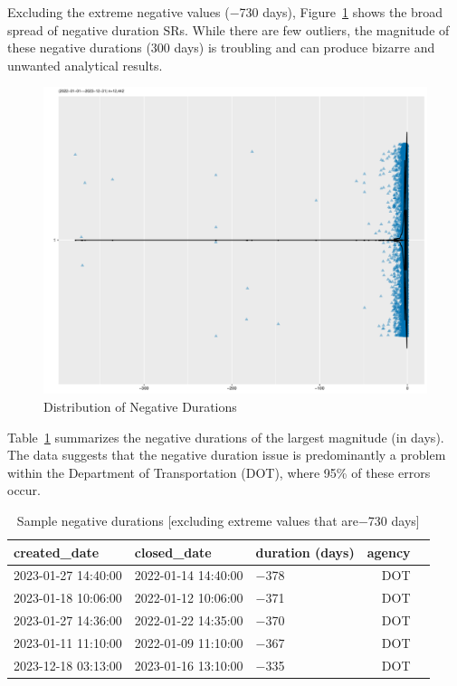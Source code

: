 \documentclass[linenumber]{jdsart}
\begin{document}
Excluding the extreme negative values ($-$730 days), 
Figure~\ref{fig:negative-duration-violin} shows the broad spread of 
negative duration SRs. While there are few outliers, the magnitude 
of these negative durations (300 days) is troubling and can produce 
bizarre and unwanted analytical results.

\begin{figure}[tbp]
	 \centering
 	 \includegraphics[width=\textwidth]{negative_duration_SR_violin.pdf}
 \caption{Distribution of Negative Durations}
 \label{fig:negative-duration-violin}
\end{figure}

Table~\ref{tab:largest-errors} summarizes the 
negative durations of the largest magnitude (in days). The data 
suggests that the negative duration issue is predominantly a problem 
within the Department of Transportation (DOT), where 95\% of these 
errors occur.

\begin{table}[tbp]
  \centering
  \caption{Sample  negative durations [excluding extreme  values that are$-$730 days]}
   \label{tab:largest-errors}
 	\begin{tabular}{l l l r l}
    \toprule
    {created\_date} & {closed\_date} & {duration (days)}  & {agency} \\
    \midrule
    2023-01-27 14:40:00 & 2022-01-14 14:40:00 & $-$378 & DOT \\
    2023-01-18 10:06:00 & 2022-01-12 10:06:00 & $-$371 & DOT \\
    2023-01-27 14:36:00 & 2022-01-22 14:35:00 & $-$370 & DOT \\
    2023-01-11 11:10:00 & 2022-01-09 11:10:00 & $-$367 & DOT \\
    2023-12-18 03:13:00 & 2023-01-16 13:10:00 & $-$335 & DOT \\
    \bottomrule
    \end{tabular}
 \end{table}
\end{document}
